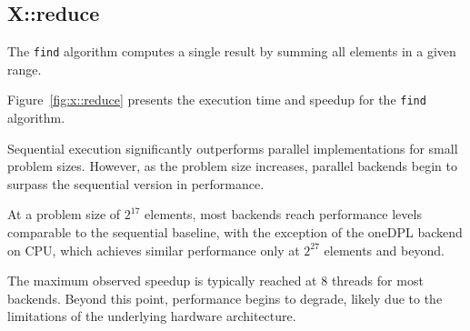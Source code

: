 \documentclass[sigconf]{acmart}
\begin{document}
\subsection{X::reduce}
The \texttt{find} algorithm computes a single result by summing all elements in
a given range.

Figure~\ref{fig:x::reduce} presents the execution time and speedup for the
\texttt{find} algorithm.

Sequential execution significantly outperforms parallel implementations for
small problem sizes. However, as the problem size increases, parallel backends
begin to surpass the sequential version in performance.

At a problem size of $2^{17}$ elements, most backends reach performance levels
comparable to the sequential baseline, with the exception of the oneDPL backend
on CPU, which achieves similar performance only at $2^{27}$ elements and
beyond.

The maximum observed speedup is typically reached at 8 threads for most
backends. Beyond this point, performance begins to degrade, likely due to the
limitations of the underlying hardware architecture.
\end{document}
